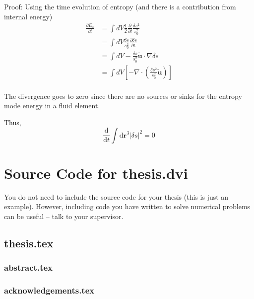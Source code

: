 Proof: Using the time evolution of entropy (and there is a contribution from internal energy)
\begin{equation*}
    \begin{split}
        \frac{\partial  E_{s} }{\partial t}
        &= \int dV \frac{1}{2} \frac{\partial} {\partial t}\frac{\delta s^{2}}{s_{0}^{2}}\\
        &=\int dV \frac{\delta s}{s_0^2}\frac{\partial \delta s}{\partial t} \\
        &=\int dV -\frac{\delta s}{s_0^2} \tilde{\boldsymbol{u}}\cdot \nabla \delta s \\
        &=\int dV \left[-\nabla \cdot \left( \frac{\delta s^2}{s_0^2} \tilde{\boldsymbol{u}} \right)\right]\\
    \end{split}
\end{equation*}

The divergence goes to zero since there are no sources or sinks for the entropy mode energy in a fluid element.

Thus, 
\begin{equation}
    \label{eq:Entropy E cons}
    \frac{\mathrm{d}}{\mathrm{d} t} \int \mathrm{d}\boldsymbol{r}^3 |\delta s|^{2} = 0
\end{equation}


\chapter{Source Code for thesis.dvi}

You do not need to include the source code for your thesis (this is just an example).
However, including code you have written to solve numerical problems 
can be useful -- talk to your supervisor.

\linespread{1}
\footnotesize

\section{thesis.tex}

\subsection{abstract.tex}

\subsection{acknowledgements.tex}

